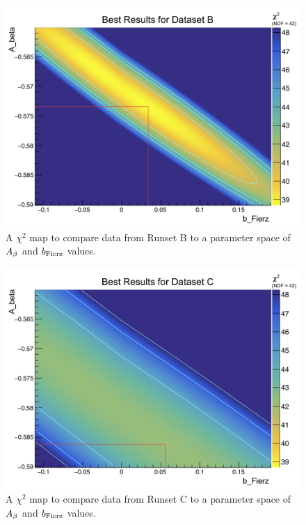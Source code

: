 \begin{figure}[h!tb]
	\centering
	\includegraphics[width=.999\linewidth]
	{Figures/Chi2_2D_SetB.png}
	\caption[$\chi^2$ Map for Runset B]{A $\chi^2$ map to compare data from Runset B to a parameter space of $A_{\beta}$ and $b_{\mathrm{Fierz}}$ values.}	
	\label{fig:2dchi2_setB}
\end{figure}
%
\begin{figure}[h!tb]
	\centering
	\includegraphics[width=.999\linewidth]
	{Figures/Chi2_2D_SetC.png}
	\caption[$\chi^2$ Map for Runset C]{A $\chi^2$ map to compare data from Runset C to a parameter space of $A_{\beta}$ and $b_{\mathrm{Fierz}}$ values.}	
	\label{fig:2dchi2_setC}
\end{figure}
%
